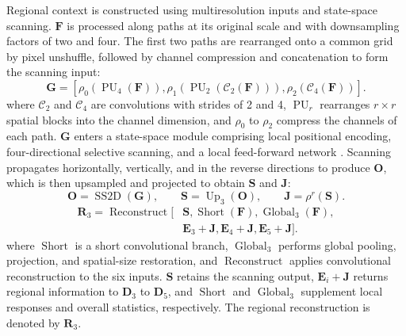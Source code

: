 \documentclass[authoryear,preprint,12pt]{elsarticle}
\begin{document}
Regional context is constructed using multiresolution inputs and state-space scanning. \(\mathbf F\) is processed along paths at its original scale and with downsampling factors of two and four. The first two paths are rearranged onto a common grid by pixel unshuffle, followed by channel compression and concatenation to form the scanning input:
\begin{equation}\label{eq:oscd_scan_input}
 \mathbf G=\left[
 \rho_0\!\left(\operatorname{PU}_{4}(\mathbf F)\right),
 \rho_1\!\left(\operatorname{PU}_{2}(\mathcal C_{2}(\mathbf F))\right),
 \rho_2\!\left(\mathcal C_{4}(\mathbf F)\right)
 \right].
\end{equation}
where \(\mathcal C_2\) and \(\mathcal C_4\) are convolutions with strides of 2 and 4, \(\operatorname{PU}_r\) rearranges \(r\times r\) spatial blocks into the channel dimension, and \(\rho_0\) to \(\rho_2\) compress the channels of each path. \(\mathbf G\) enters a state-space module comprising local positional encoding, four-directional selective scanning, and a local feed-forward network \citep{gu2023mamba,liu2024vmamba}. Scanning propagates horizontally, vertically, and in the reverse directions to produce \(\mathbf O\), which is then upsampled and projected to obtain \(\mathbf S\) and \(\mathbf J\):
\begin{equation}\label{eq:oscd_context_flow}
 \mathbf O=\operatorname{SS2D}(\mathbf G),\qquad
 \mathbf S=\operatorname{Up}_{3}(\mathbf O),\qquad
 \mathbf J=\rho^r(\mathbf S).
\end{equation}
\begin{equation}\label{eq:oscd_context_reconstruction}
 \begin{aligned}
 \mathbf R_3=\operatorname{Reconstruct}\!\big[&\mathbf S,\operatorname{Short}(\mathbf F),
 \operatorname{Global}_{3}(\mathbf F),\\
 &\mathbf E_3+\mathbf J,\mathbf E_4+\mathbf J,\mathbf E_5+\mathbf J\big].
 \end{aligned}
\end{equation}
where \(\operatorname{Short}\) is a short convolutional branch, \(\operatorname{Global}_3\) performs global pooling, projection, and spatial-size restoration, and \(\operatorname{Reconstruct}\) applies convolutional reconstruction to the six inputs. \(\mathbf S\) retains the scanning output, \(\mathbf E_i+\mathbf J\) returns regional information to \(\mathbf D_3\) to \(\mathbf D_5\), and \(\operatorname{Short}\) and \(\operatorname{Global}_3\) supplement local responses and overall statistics, respectively. The regional reconstruction is denoted by \(\mathbf R_3\).
\end{document}
